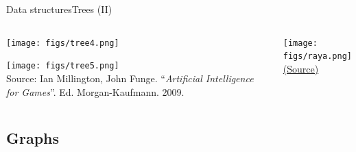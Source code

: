 \documentclass[10pt,compress]{beamer} %
\begin{document}
\begin{frame}{Data structures}{Trees (II)}
    \begin{columns}
	   	\begin{center}
		\vspace{-0.2cm}
		\texttt{[image: figs/tree4.png]}

		\bigskip

		\vspace{-0.2cm}
		\texttt{[image: figs/tree5.png]}\\
		\tiny
		Source: Ian Millington, John Funge. ``\textit{Artificial Intelligence for Games}''. Ed. Morgan-Kaufmann. 2009.
		\end{center}

	   	\begin{center}
		\texttt{[image: figs/raya.png]}\\
		\tiny{\href{http://www.ocf.berkeley.edu/~yosenl/extras/alphabeta/alphabeta.html}{(Source)}}
	   	\end{center}
		\end{columns}
\end{frame}

\subsection{Graphs}
\end{document}
